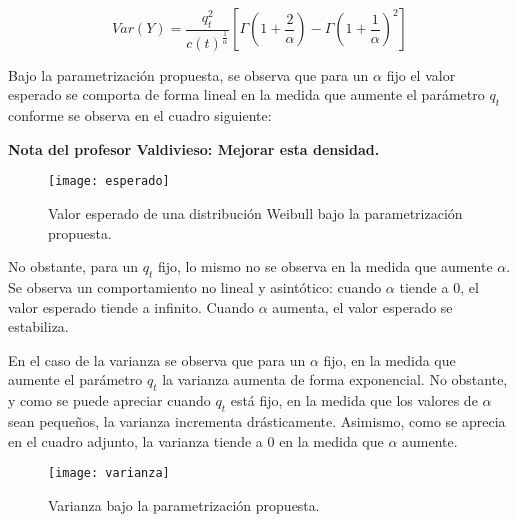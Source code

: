 \begin{equation}
Var(Y)=\frac{q_{t}^{2}}{c(t)^{\frac{1}{\alpha}}}\left[ \Gamma\left( 1+\frac{2}{\alpha}\right)-\Gamma\left( 1+\frac{1}{\alpha} \right)^{2} \right]
\end{equation}

Bajo la parametrización propuesta, se observa que para un $\alpha$ fijo el valor esperado se comporta de forma lineal en la medida que aumente el parámetro $q_{t}$ conforme se observa en el cuadro siguiente:

\textbf{Nota del profesor Valdivieso: Mejorar esta densidad.}

\begin{figure}[H]
	\texttt{[image: esperado]}
	\caption{Valor esperado de una distribución Weibull bajo la parametrización propuesta.}
\end{figure}
\noindent No obstante, para un $q_{t}$ fijo, lo mismo no se observa en la medida que aumente $\alpha$. Se observa un comportamiento no lineal y asintótico: cuando $\alpha$ tiende a 0, el valor esperado tiende a infinito. Cuando $\alpha$ aumenta, el valor esperado se estabiliza.

En el caso de la varianza se observa que para un $\alpha$ fijo, en la medida que aumente el parámetro $q_{t}$ la varianza aumenta de forma exponencial. No obstante, y como se puede apreciar cuando $q_{t}$ está fijo, en la medida que los valores de $\alpha$ sean pequeños, la varianza incrementa drásticamente. Asimismo, como se aprecia en el cuadro adjunto, la varianza tiende a 0 en la medida que $\alpha$ aumente.

\begin{figure}[H]
	\texttt{[image: varianza]}
	\caption{Varianza bajo la parametrización propuesta.}
\end{figure}
